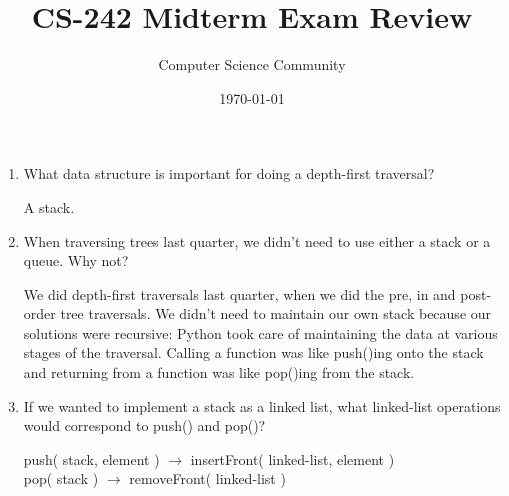 \documentclass[11pt]{article}
\author{Computer Science Community}
\title{CS-242 Midterm Exam Review}
\date{\today}
\newenvironment{answer}{\large\lstset{basicstyle=\large}\color{white}}{}
\newenvironment{answer}{\large\lstset{basicstyle=\large}\color{red}}{}
\begin{document}
\header

\begin{enumerate}
\section*{Stacks and Queues}
    \item What data structure is important for doing a depth-first traversal?

        \begin{answer}
        A stack.
        \end{answer}

    \item When traversing trees last quarter, we didn't need to use either a
        stack or a queue. Why not?

        \begin{answer}
        We did depth-first traversals last quarter, when we did the pre, in and
        post-order tree traversals. We didn't need to maintain our own stack
        because our solutions were recursive: Python took care of maintaining
        the data at various stages of the traversal. Calling a function was
        like push()ing onto the stack and returning from a function was like
        pop()ing from the stack.
        \end{answer}

    \item If we wanted to implement a stack as a linked list, what linked-list
        operations would correspond to push() and pop()?

        \begin{answer}
        push( stack, element ) $\rightarrow$ insertFront( linked-list, element )\\
        pop( stack ) $\rightarrow$ removeFront( linked-list )
        \end{answer}
        

\end{enumerate}
\end{document}
